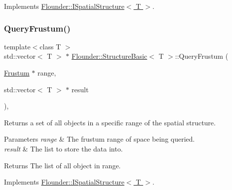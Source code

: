 Implements \hyperlink{class_flounder_1_1_i_spatial_structure_a5059213aabb41bc892b9ec6bb6f996b2}{Flounder\+::\+I\+Spatial\+Structure$<$ T $>$}.

\mbox{\label{class_flounder_1_1_structure_basic_afdd33be8810c3f2a55ce161b0d956fa2}} 
\subsubsection{\texorpdfstring{Query\+Frustum()}{QueryFrustum()}}
{\footnotesize\ttfamily template$<$class T $>$ \\
std\+::vector$<$ T $>$ $\ast$ \hyperlink{class_flounder_1_1_structure_basic}{Flounder\+::\+Structure\+Basic}$<$ T $>$\+::Query\+Frustum (\begin{DoxyParamCaption}\item[{\hyperlink{class_flounder_1_1_frustum}{Frustum} $\ast$}]{range,  }\item[{std\+::vector$<$ T $>$ $\ast$}]{result }\end{DoxyParamCaption})\hspace{0.3cm}{\ttfamily [override]}, {\ttfamily [virtual]}}



Returns a set of all objects in a specific range of the spatial structure. 


\begin{DoxyParams}{Parameters}
{\em range} & The frustum range of space being queried. \\
\hline
{\em result} & The list to store the data into. \\
\hline
\end{DoxyParams}
\begin{DoxyReturn}{Returns}
The list of all object in range. 
\end{DoxyReturn}


Implements \hyperlink{class_flounder_1_1_i_spatial_structure_a152be1fdfdc76866c1c18c4c2f72b09b}{Flounder\+::\+I\+Spatial\+Structure$<$ T $>$}.

\mbox{\label{class_flounder_1_1_structure_basic_a850d10cc6ca577bd59698d9b63e83bf4}} 
